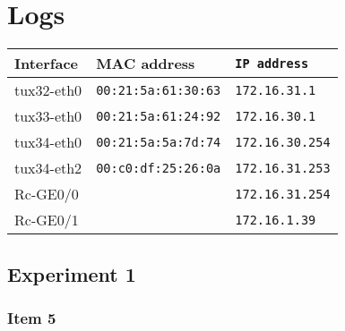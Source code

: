 \documentclass[a4paper, 11pt]{report}
\begin{document}
\fancyhfoffset{0pt}
\chapter{Logs}

\renewcommand{\thelstlisting}{%
  \thechapter.\thesubsection(\arabic{lstlisting})%
}

\begin{center}
    \begin{tabular}{l | l | l}
        \textbf{Interface} & \textbf{MAC address}       & \texttt{IP address}    \\ \hline
        tux32-eth0         & \texttt{00:21:5a:61:30:63} & \texttt{172.16.31.1  } \\
        tux33-eth0         & \texttt{00:21:5a:61:24:92} & \texttt{172.16.30.1  } \\
        tux34-eth0         & \texttt{00:21:5a:5a:7d:74} & \texttt{172.16.30.254} \\
        tux34-eth2         & \texttt{00:c0:df:25:26:0a} & \texttt{172.16.31.253} \\
        Rc-GE0/0           & \texttt{                 } & \texttt{172.16.31.254} \\
        Rc-GE0/1           & \texttt{                 } & \texttt{172.16.1.39  } \\
    \end{tabular}
\end{center}

\section{Experiment 1}
\setcounter{subsection}{4}
\subsection{Item 5}




\end{document}
